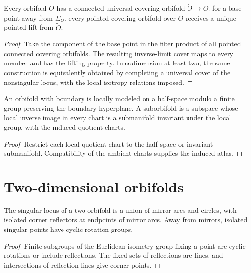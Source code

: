 \begin{proposition}
\label{thurston-ch13-universal-cover}

Every orbifold $O$ has a connected universal covering orbifold
$\widetilde O\to O$: for a base point away from $\Sigma_O$, every pointed
covering orbifold over $O$ receives a unique pointed lift from $\widetilde O$.
\end{proposition}
\begin{proof}
\sketch Take the component of the base point in the fiber product of all
pointed connected covering orbifolds.  The resulting inverse-limit cover maps
to every member and has the lifting property.  In codimension at least two,
the same construction is equivalently obtained by completing a universal cover
of the nonsingular locus, with the local isotropy relations imposed.
\end{proof}

\begin{definition}
\label{thurston-ch13-boundary-suborbifold}

An orbifold with boundary is locally modeled on a half-space modulo a finite
group preserving the boundary hyperplane.  A suborbifold is a subspace whose
local inverse image in every chart is a submanifold invariant under the local
group, with the induced quotient charts.
\end{definition}
\begin{proof}
\sketch Restrict each local quotient chart to the half-space or invariant
submanifold.  Compatibility of the ambient charts supplies the induced atlas.
\end{proof}

\section{Two-dimensional orbifolds}

\begin{proposition}
\label{thurston-ch13-surface-singular-locus}

The singular locus of a two-orbifold is a union of mirror arcs and circles,
with isolated corner reflectors at endpoints of mirror arcs.  Away from mirrors,
isolated singular points have cyclic rotation groups.
\end{proposition}
\begin{proof}
\sketch Finite subgroups of the Euclidean isometry group fixing a point are
cyclic rotations or include reflections.  The fixed sets of reflections are
lines, and intersections of reflection lines give corner points.
\end{proof}

